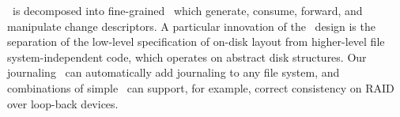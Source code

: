 \Kudos\ is decomposed into fine-grained \modules\ which generate, consume,
forward, and manipulate change descriptors. A particular innovation of the
\module\ design is the separation of the low-level specification of on-disk
layout from higher-level file system-independent code, which operates on
abstract disk structures. Our journaling \module\ can automatically add
journaling to any file system, and combinations of simple \modules\ can support,
for example, correct consistency on RAID over loop-back devices.
